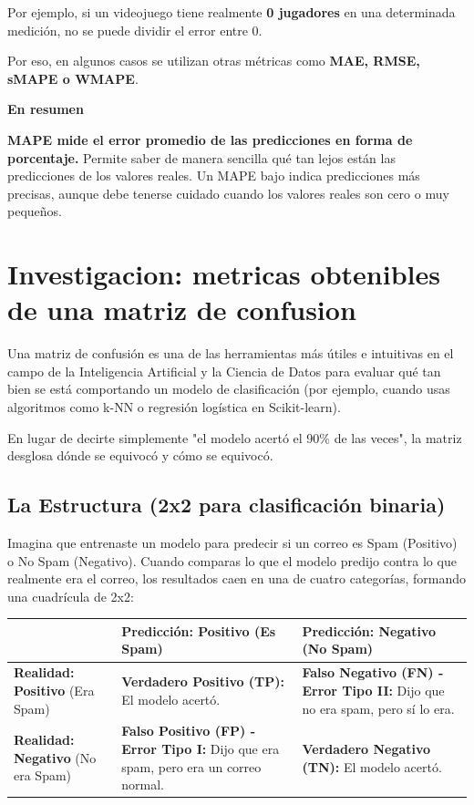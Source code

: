 \documentclass[]{article}
\begin{document}
Por ejemplo, si un videojuego tiene realmente \textbf{0 jugadores} en
una determinada medición, no se puede dividir el error entre 0.

Por eso, en algunos casos se utilizan otras métricas como \textbf{MAE,
RMSE, sMAPE o WMAPE}.

\textbf{En resumen}

\textbf{MAPE mide el error promedio de las predicciones en forma de
porcentaje.} Permite saber de manera sencilla qué tan lejos están las
predicciones de los valores reales. Un MAPE bajo indica predicciones más
precisas, aunque debe tenerse cuidado cuando los valores reales son cero
o muy pequeños.

\newpage
\label{inv1}
\section{Investigacion: metricas obtenibles de una matriz de confusion}
Una matriz de confusión es una de las herramientas más útiles e intuitivas en el campo de la Inteligencia Artificial y la Ciencia de Datos para evaluar qué tan bien se está comportando un modelo de clasificación (por ejemplo, cuando usas algoritmos como k-NN o regresión logística en Scikit-learn).

En lugar de decirte simplemente "el modelo acertó el 90\% de las veces", la matriz desglosa dónde se equivocó y cómo se equivocó.

\subsection*{La Estructura (2x2 para clasificación binaria)}
Imagina que entrenaste un modelo para predecir si un correo es Spam (Positivo) o No Spam (Negativo). Cuando comparas lo que el modelo predijo contra lo que realmente era el correo, los resultados caen en una de cuatro categorías, formando una cuadrícula de 2x2:

\begin{table}[h!]
\centering
\renewcommand{\arraystretch}{1.4}
\begin{tabularx}{\textwidth}{|>{\raggedright\arraybackslash}p{2.2cm}|X|X|}
\hline
& \textbf{Predicción: Positivo} (Es Spam) & \textbf{Predicción: Negativo} (No Spam) \\ \hline
\textbf{Realidad: Positivo} (Era Spam) & \textbf{Verdadero Positivo (TP):} El modelo acertó. & \textbf{Falso Negativo (FN) - Error Tipo II:} Dijo que no era spam, pero sí lo era. \\ \hline
\textbf{Realidad: Negativo} (No era Spam) & \textbf{Falso Positivo (FP) - Error Tipo I:} Dijo que era spam, pero era un correo normal. & \textbf{Verdadero Negativo (TN):} El modelo acertó. \\ \hline
\end{tabularx}
\end{table}
\end{document}
